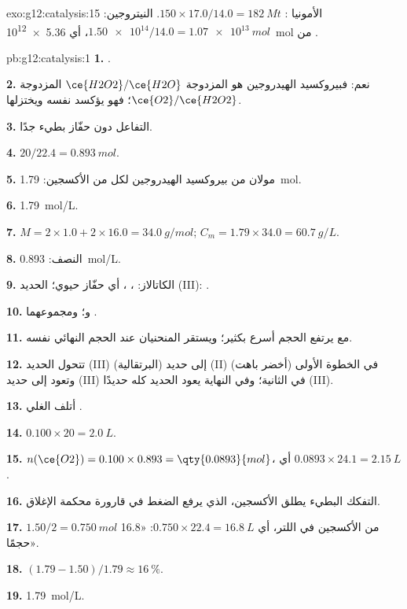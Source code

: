 \begin{solution}{exo:g12:catalysis:15}
الأمونيا : $150 \times 17.0 / 14.0 = \qty{182}{Mt}$. 
النيتروجين: $\num{1.50e14} / 14.0 = \qty{1.07e13}{mol}$، أي
\qty{5.36e12}{mol} من .
\end{solution}

\begin{solution}{pb:g12:catalysis:1}
\textbf{1.} .

\textbf{2.} نعم: فبيروكسيد الهيدروجين هو  المزدوجة
$\ce{H2O2}/\ce{H2O}$  المزدوجة $\ce{O2}/\ce{H2O2}$؛ فهو
يؤكسد نفسه ويختزلها.

\textbf{3.} التفاعل دون حفّاز بطيء جدًا.

\textbf{4.} $20 / 22.4 = \qty{0.893}{mol}$.

\textbf{5.} مولان من بيروكسيد الهيدروجين لكل  من الأكسجين:
\qty{1.79}{mol}.

\textbf{6.} \qty{1.79}{mol/L}.

\textbf{7.} $M = 2 \times 1.0 + 2 \times 16.0 = \qty{34.0}{g/mol}$;
$C_m = 1.79 \times 34.0 = \qty{60.7}{g/L}$.

\textbf{8.} النصف: \qty{0.893}{mol/L}.

\textbf{9.} الكاتالاز: ، ، أي حفّاز حيوي؛
 الحديد (III): .

\textbf{10.} 
و؛ ومجموعهما
.

\textbf{11.} مع  يرتفع الحجم أسرع بكثير؛ ويستقر المنحنيان
عند الحجم النهائي نفسه.

\textbf{12.} تتحول  الحديد (III) (البرتقالية) إلى حديد (II) (أخضر
باهت) في الخطوة الأولى وتعود إلى حديد (III) في الثانية؛ وفي
النهاية يعود الحديد كله حديدًا (III).

\textbf{13.} أتلف الغلي .

\textbf{14.} $0.100 \times 20 = \qty{2.0}{L}$.

\textbf{15.} $n(\ce{O2}) = 0.100 \times 0.893 = \qty{0.0893}{mol}$، أي
$0.0893 \times 24.1 = \qty{2.15}{L}$.

\textbf{16.} التفكك البطيء يطلق الأكسجين، الذي يرفع
الضغط في قارورة محكمة الإغلاق.

\textbf{17.} $1.50 / 2 = \qty{0.750}{mol}$ من الأكسجين في اللتر، أي
$0.750 \times 22.4 = \qty{16.8}{L}$: «16.8 حجمًا».

\textbf{18.} $(1.79 - 1.50)/1.79 \approx \qty{16}{\percent}$.

\textbf{19.} \qty{1.79}{mol/L}.
\end{solution}
